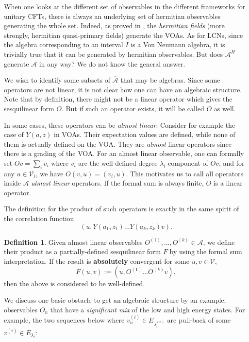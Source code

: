 \documentclass[twoside,11pt,titlepage]{amsart}
\renewcommand{\=}[1]{\stackrel{#1}{=}} %
\theoremstyle{definition}
\newtheorem{dfn}{Definition}
\theoremstyle{remark}
\begin{document}
When one looks at the different set of observables in the different frameworks for unitary CFTs, there is always an underlying set of hermitian observables generating the whole set. Indeed, as proved in \cite{carpi2015vertex}, the \textit{hermitian fields} (more strongly, hermitian quasi-primary fields) generate the VOAs. As for LCNs, since the algebra corresponding to an interval $I$ is a Von Neumann algebra, it is trivially true that it can be generated by hermitian observables. But does $\mathcal{A}^H$ generate $\mathcal{A}$ in any way? We do not know the general answer.

We wish to identify some subsets of $\overline{\mathcal{A}}$ that may be algebras. Since some operators are not linear, it is not clear how one can have an algebraic structure. Note that by definition, there might not be a linear operator which gives the sesquilinear form $O$. But if such an operator exists, it will be called $O$ as well.

In some cases, these operators can be \textit{almost linear}. Consider for example the case of $Y(a,z)$ in VOAs. Their expectation values are defined, while none of them is actually defined on the VOA. They are \textit{almost} linear operators since there is a grading of the VOA. For an almost linear observable, one can formally set $Ov=\sum_i v_i$ where $v_i$ are the well-defined degree $\lambda_i$ component of $Ov$, and for any $u \in \mathcal{V}_i$, we have $O(v,u)=(v_i,u)$. This motivates us to call all operators inside $\mathcal{A}$ \textit{almost linear} operators. If the formal sum is always finite, $O$ is a linear operator.

The definition for the product of such operators is exactly in the same spirit of the correlation function $$(u,Y(a_1,z_1)\ldots Y(a_k,z_k)v).$$
\begin{dfn}\label{dfn7}
Given almost linear observables $O^{(1)},\ldots,O^{(k)} \in \mathcal{A}$, we define their product as a partially-defined sesquilinear form $F$ by using the formal sum interpretation. If the result is \textbf{absolutely} convergent for some $u,v \in \mathcal{V}$,
$$F(u,v):=(u,O^{(1)}\ldots O^{(k)}v),$$
then the above is considered to be well-defined.
\end{dfn}
We discuss one basic obstacle to get an algebraic structure by an example; observables $O_n$ that have a \textit{significant mix} of the low and high energy states. For example, the two sequences below where $v^{(i)}_n \in E_{\lambda_i^{(n)}}$ are pull-back of some $v^{(i)} \in E_{\lambda_i}$:
\end{document}

